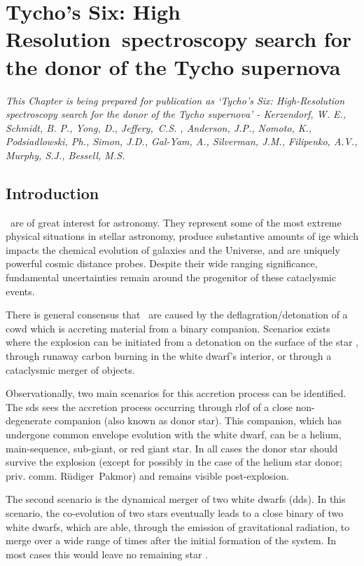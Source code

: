 \chapter[Tycho's Six]{Tycho's Six: High Resolution~spectroscopy search for the donor of the Tycho supernova}
\label{chap:sn1572_hires}
\emph{\small This Chapter is being prepared for publication as `Tycho's Six: High-Resolution spectroscopy search for the donor of the Tycho supernova' - 
Kerzendorf, W. E., Schmidt, B. P., Yong, D., Jeffery,~C.S. ,  Anderson, J.P., Nomoto, K., Podsiadlowski,  Ph., Simon, J.D., Gal-Yam, A., Silverman, J.M., Filipenko, A.V., Murphy, S.J., Bessell, M.S.}

\section{Introduction}
\label{sec:sn1572_hires:introduction}

\sneia\ are of great interest for astronomy. They represent some of the most extreme physical situations in stellar astronomy, produce substantive amounts of \gls{ige} which impacts the chemical evolution of galaxies and the Universe, and are uniquely powerful cosmic distance probes. Despite their wide ranging significance, fundamental uncertainties remain around the progenitor of these cataclysmic events. 

There is general consensus that \sneia\ are caused by the deflagration/detonation of a \gls{cowd} which is accreting material from a binary companion. Scenarios exists where the explosion can be initiated from a detonation on the surface of the star \citep{1995ApJ...452...62L, 2010A&A...514A..53F}, through runaway carbon burning in the white dwarf's interior, or through a cataclysmic merger of objects.

Observationally, two main scenarios for this accretion process can be identified. The \gls{sds} sees the accretion process occurring through \gls{rlof} of a close non-degenerate companion (also known as \gls{donor} star). This companion, which has undergone common envelope evolution with the white dwarf, can be a helium, main-sequence, sub-giant, or red giant star. In all cases the donor star should survive the explosion (except for possibly in the case of the helium star donor; priv. comm. R\"udiger~Pakmor) and remains visible post-explosion. 

The second scenario is the  dynamical merger of two white dwarfs (\gls{dds}). In this scenario, the co-evolution of two stars eventually leads to a close binary of two white dwarfs, which are able, through the emission of gravitational radiation, to merge over a wide range of times after the initial formation of the system. In most cases this would leave no remaining star \citep[e.g.][]{2010Natur.463...61P}.

